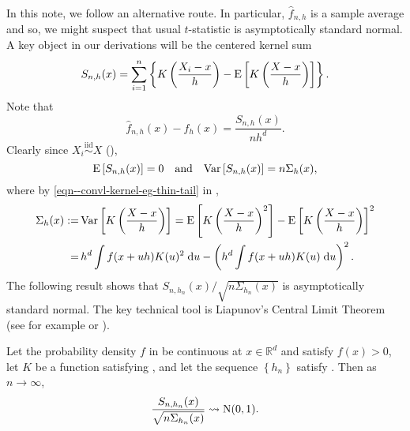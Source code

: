 In this note, we follow an alternative route.
In particular, \(\widehat{f}_{n, h}\) is a sample average and so,
we might suspect that usual \(t\)-statistic is asymptotically standard normal.
A key object in our derivations will be the centered kernel sum
\begin{equation}
  S_{n, h} (x) = \sum_{i = 1}^{n} \left\{ K \left( \frac{X_{i} - x}{h} \right) -
  \mathrm{E} \left[ K \left( \frac{X - x}{h} \right) \right] \right\}.
  \label{eqn--kernel-sum}
\end{equation}
Note that
\begin{equation*}
  \widehat{f}_{n, h} (x) - f_{h} (x) = \frac{S_{n, h} (x)}{n h^{d}}.
\end{equation*}
Clearly since \(X_{i} \overset{\mathrm{iid}}{\sim} X\) (),
\begin{equation}
  \mathrm{E} \left[ S_{n, h} (x) \right] = 0 \quad \text{and} \quad \mathrm{Var}
  \left[ S_{n, h} (x) \right] = n \Sigma_{h} (x),
\end{equation}
where by \eqref{eqn--convl-kernel-eg-thin-tail} in
,
\begin{equation}
  \begin{split}
    \Sigma_{h} (x) :=
    & \, \mathrm{Var} \left[ K \left( \frac{X - x}{h} \right) \right] = \mathrm{E}
    \left[ K \left( \frac{X - x}{h} \right)^{2} \right] - \mathrm{E} \left[ K \left(
    \frac{X - x}{h} \right) \right]^{2} \\
    =
    & \, h^{d} \int f (x + u h) K (u)^{2} \; \mathrm{d} u
    - \left( h^{d} \int f (x + u h) K (u) \; \mathrm{d} u \right)^{2}.
  \end{split}
\end{equation}
The following result shows that \(S_{n, h_{n}} (x) / \sqrt{n \Sigma_{h_{n}}
(x)}\) is asymptotically standard normal.
The key technical tool is Liapunov's Central Limit Theorem (see for example
\citet[Theorem 27.3, p. 362]{1995billingsleyProbabilityMeasure}
or \citet[Theorem 18 in Section 4 of Chapter III,
p. 51]{1984pollardConvergenceStochasticProcesses}).

\begin{theorem}
\label{thm--kernel-sum-asymptotic-normality}
Let the probability density \(f\) in  be continuous at \(x
\in \mathbb{R}^{d}\) and satisfy \(f (x) > 0\), let \(K\) be a function
satisfying , and let the sequence \(\left\{ h_{n} \right\}\)
satisfy .
Then as \(n \to \infty\),
\begin{equation}
  \frac{S_{n, h_{n}} (x)}{\sqrt{n \Sigma_{h_{n}} (x)}} \rightsquigarrow \mathrm{N} (0,
  1).
  \label{eqn--kernel-sum-asymptotic-normality}
\end{equation}
\end{theorem}

